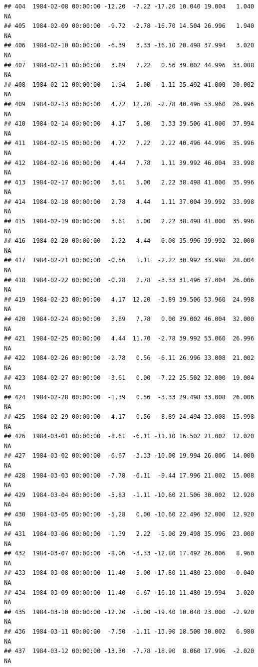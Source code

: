 \documentclass{article}\usepackage{graphicx, color}
\makeatletter
\newenvironment{kframe}{%
 \def\at@end@of@kframe{}%
 \ifinner\ifhmode%
  \def\at@end@of@kframe{\end{minipage}}%
  \begin{minipage}{\columnwidth}%
 \fi\fi%
 \def\FrameCommand##1{\hskip\@totalleftmargin \hskip-\fboxsep
 \colorbox{shadecolor}{##1}\hskip-\fboxsep
     \hskip-\linewidth \hskip-\@totalleftmargin \hskip\columnwidth}%
 \MakeFramed {\advance\hsize-\width
   \@totalleftmargin\z@ \linewidth\hsize
   \@setminipage}}%
 {\par\unskip\endMakeFramed%
 \at@end@of@kframe}
\newenvironment{knitrout}{}{} %
\makeatother
\begin{document}
\begin{knitrout}
\begin{kframe}
\begin{verbatim}
## 404  1984-02-08 00:00:00 -12.20  -7.22 -17.20 10.040 19.004   1.040     NA
## 405  1984-02-09 00:00:00  -9.72  -2.78 -16.70 14.504 26.996   1.940     NA
## 406  1984-02-10 00:00:00  -6.39   3.33 -16.10 20.498 37.994   3.020     NA
## 407  1984-02-11 00:00:00   3.89   7.22   0.56 39.002 44.996  33.008     NA
## 408  1984-02-12 00:00:00   1.94   5.00  -1.11 35.492 41.000  30.002     NA
## 409  1984-02-13 00:00:00   4.72  12.20  -2.78 40.496 53.960  26.996     NA
## 410  1984-02-14 00:00:00   4.17   5.00   3.33 39.506 41.000  37.994     NA
## 411  1984-02-15 00:00:00   4.72   7.22   2.22 40.496 44.996  35.996     NA
## 412  1984-02-16 00:00:00   4.44   7.78   1.11 39.992 46.004  33.998     NA
## 413  1984-02-17 00:00:00   3.61   5.00   2.22 38.498 41.000  35.996     NA
## 414  1984-02-18 00:00:00   2.78   4.44   1.11 37.004 39.992  33.998     NA
## 415  1984-02-19 00:00:00   3.61   5.00   2.22 38.498 41.000  35.996     NA
## 416  1984-02-20 00:00:00   2.22   4.44   0.00 35.996 39.992  32.000     NA
## 417  1984-02-21 00:00:00  -0.56   1.11  -2.22 30.992 33.998  28.004     NA
## 418  1984-02-22 00:00:00  -0.28   2.78  -3.33 31.496 37.004  26.006     NA
## 419  1984-02-23 00:00:00   4.17  12.20  -3.89 39.506 53.960  24.998     NA
## 420  1984-02-24 00:00:00   3.89   7.78   0.00 39.002 46.004  32.000     NA
## 421  1984-02-25 00:00:00   4.44  11.70  -2.78 39.992 53.060  26.996     NA
## 422  1984-02-26 00:00:00  -2.78   0.56  -6.11 26.996 33.008  21.002     NA
## 423  1984-02-27 00:00:00  -3.61   0.00  -7.22 25.502 32.000  19.004     NA
## 424  1984-02-28 00:00:00  -1.39   0.56  -3.33 29.498 33.008  26.006     NA
## 425  1984-02-29 00:00:00  -4.17   0.56  -8.89 24.494 33.008  15.998     NA
## 426  1984-03-01 00:00:00  -8.61  -6.11 -11.10 16.502 21.002  12.020     NA
## 427  1984-03-02 00:00:00  -6.67  -3.33 -10.00 19.994 26.006  14.000     NA
## 428  1984-03-03 00:00:00  -7.78  -6.11  -9.44 17.996 21.002  15.008     NA
## 429  1984-03-04 00:00:00  -5.83  -1.11 -10.60 21.506 30.002  12.920     NA
## 430  1984-03-05 00:00:00  -5.28   0.00 -10.60 22.496 32.000  12.920     NA
## 431  1984-03-06 00:00:00  -1.39   2.22  -5.00 29.498 35.996  23.000     NA
## 432  1984-03-07 00:00:00  -8.06  -3.33 -12.80 17.492 26.006   8.960     NA
## 433  1984-03-08 00:00:00 -11.40  -5.00 -17.80 11.480 23.000  -0.040     NA
## 434  1984-03-09 00:00:00 -11.40  -6.67 -16.10 11.480 19.994   3.020     NA
## 435  1984-03-10 00:00:00 -12.20  -5.00 -19.40 10.040 23.000  -2.920     NA
## 436  1984-03-11 00:00:00  -7.50  -1.11 -13.90 18.500 30.002   6.980     NA
## 437  1984-03-12 00:00:00 -13.30  -7.78 -18.90  8.060 17.996  -2.020     NA

\end{verbatim}
\end{kframe}
\end{knitrout}
\end{document}
